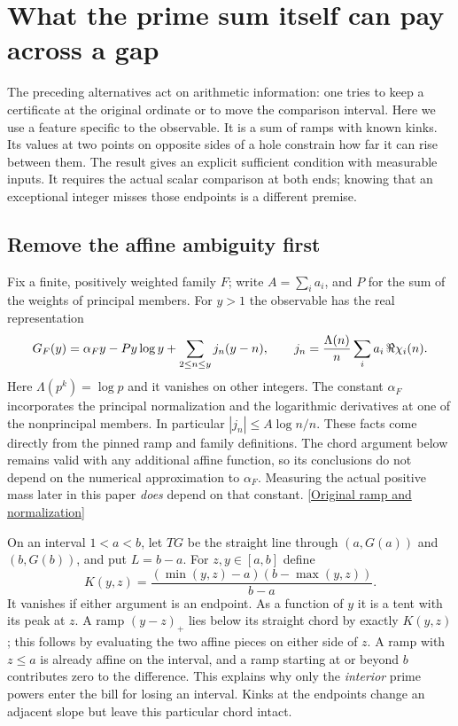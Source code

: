 \documentclass[12pt,letterpaper]{article}
\begin{document}
\section{What the prime sum itself can pay across a gap}
\label{sec:curvature}
The preceding alternatives act on arithmetic information: one tries to keep a certificate at the original ordinate or to move the comparison interval. Here we use a feature specific to the observable. It is a sum of ramps with known kinks. Its values at two points on opposite sides of a hole constrain how far it can rise between them. The result gives an explicit sufficient condition with measurable inputs. It requires the actual scalar comparison at both ends; knowing that an exceptional integer misses those endpoints is a different premise.

\subsection{Remove the affine ambiguity first}
Fix a finite, positively weighted family \(F\); write \(A=\sum_i a_i\), and \(P\) for the sum of the weights of principal members. For \(y>1\) the observable has the real representation
\begin{equation}
 G_F(y)=\alpha_F y-Py\log y+\sum_{2\le n\le y} j_n(y-n),
 \qquad j_n={\Lambda(n)\over n}\sum_i a_i\,\Re\chi_i(n).
 \label{eq:ramp}
\end{equation}
Here \(\Lambda(p^k)=\log p\) and it vanishes on other integers. The constant \(\alpha_F\) incorporates the principal normalization and the logarithmic derivatives at one of the nonprincipal members. In particular \(|j_n|\le A\log n/n\). These facts come directly from the pinned ramp and family definitions. The chord argument below remains valid with any additional affine function, so its conclusions do not depend on the numerical approximation to \(\alpha_F\). Measuring the actual positive mass later in this paper \emph{does} depend on that constant. \href{https://github.com/nousentllc/riemann-hypothesis/blob/40e56bab026552e089d7afcfeff08d2defb9c005/src/Development/AutomorphicArithmetic/DedekindLFunctions/CharFamily.lean#L10-L36}{[Original ramp and normalization]}

On an interval \(1<a<b\), let \(T G\) be the straight line through \((a,G(a))\) and \((b,G(b))\), and put \(L=b-a\). For \(z,y\in[a,b]\) define
\[
 K(y,z)=\frac{(\min(y,z)-a)(b-\max(y,z))}{b-a}.
\]
It vanishes if either argument is an endpoint. As a function of \(y\) it is a tent with its peak at \(z\). A ramp \((y-z)_+\) lies below its straight chord by exactly \(K(y,z)\); this follows by evaluating the two affine pieces on either side of \(z\). A ramp with \(z\le a\) is already affine on the interval, and a ramp starting at or beyond \(b\) contributes zero to the difference. This explains why only the \emph{interior} prime powers enter the bill for losing an interval. Kinks at the endpoints change an adjacent slope but leave this particular chord intact.
\end{document}
